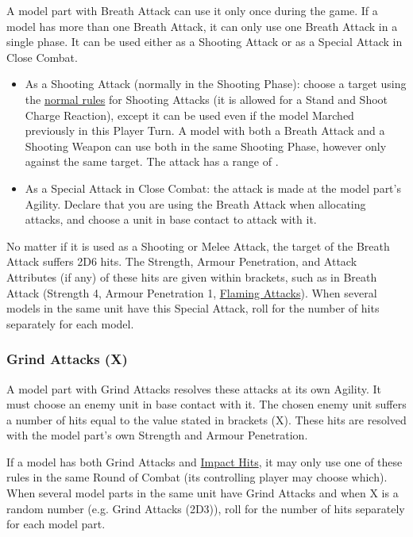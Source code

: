 A model part with Breath Attack can use it only once during the game. If a model has more than one Breath Attack, it can only use one Breath Attack in a single phase. It can be used either as a Shooting Attack or as a Special Attack in Close Combat.
\begin{itemize}[label={-}]
\item As a Shooting Attack (normally in the Shooting Phase): choose a target using the \hyperref[shooting_with_a_unit]{normal rules} for Shooting Attacks (it is allowed for a Stand and Shoot Charge Reaction), except it can be used even if the model Marched previously in this Player Turn. A model with both a Breath Attack and a Shooting Weapon can use both in the same Shooting Phase, however only against the same target. The attack has a range of . 
\item As a Special Attack in Close Combat: the attack is made at the model part's Agility. Declare that you are using the Breath Attack when allocating attacks, and choose a unit in base contact to attack with it.
\end{itemize}  
No matter if it is used as a Shooting or Melee Attack, the target of the Breath Attack suffers 2D6 hits. The Strength, Armour Penetration, and Attack Attributes (if any) of these hits are given within brackets, such as in Breath Attack (Strength 4, Armour Penetration 1, \hyperref[flaming_attacks]{Flaming Attacks}). When several models in the same unit have this Special Attack, roll for the number of hits separately for each model.

\subsubsection{Grind Attacks (X)}
\label{grind_attacks}

A model part with Grind Attacks resolves these attacks at its own Agility. It must choose an enemy unit in base contact with it. The chosen enemy unit suffers a number of hits equal to the value stated in brackets (X). These hits are resolved with the model part's own Strength and Armour Penetration.

If a model has both Grind Attacks and \hyperref[impact_hits]{Impact Hits}, it may only use one of these rules in the same Round of Combat (its controlling player may choose which). When several model parts in the same unit have Grind Attacks and when X is a random number (e.g. Grind Attacks (2D3)), roll for the number of hits separately for each model part.

